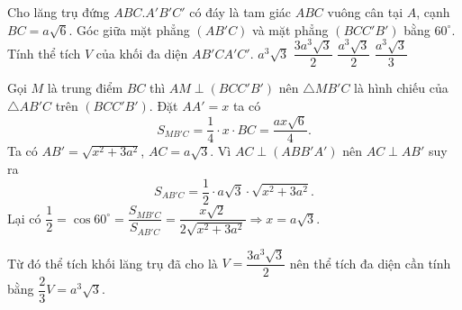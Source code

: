 \begin{ex}%
 Cho lăng trụ đứng $ABC.A'B'C'$ có đáy là tam giác $ABC$ vuông cân tại $A$, cạnh $BC=a\sqrt{6}$. Góc giữa mặt phẳng $(AB'C)$ và mặt phẳng $(BCC'B')$ bằng $60^\circ$. Tính thể tích $V$ của khối đa diện $AB'CA'C'$.
 \choice
  {\True $a^3\sqrt{3}$}
  {$\dfrac{3a^3\sqrt{3}}{2}$}
  {$\dfrac{a^3\sqrt{3}}{2}$}
  {$\dfrac{a^3\sqrt{3}}{3}$}
 \loigiai
  {
  \immini
  {
  Gọi $M$ là trung điểm $BC$ thì $AM\perp (BCC'B')$ nên $\triangle MB'C$ là hình chiếu của $\triangle AB'C$ trên $(BCC'B')$. Đặt $AA'=x$ ta có
  $$S_{MB'C}=\dfrac{1}{4}\cdot x\cdot BC=\dfrac{ax\sqrt{6}}{4}.$$
  Ta có $AB'=\sqrt{x^2+3a^2}$, $AC=a\sqrt{3}$. Vì $AC\perp (ABB'A')$ nên $AC\perp AB'$ suy ra
  $$S_{AB'C}=\dfrac{1}{2}\cdot a\sqrt{3}\cdot \sqrt{x^2+3a^2}.$$
  Lại có $\dfrac{1}{2}=\cos 60^\circ=\dfrac{S_{MB'C}}{S_{AB'C}}=\dfrac{x\sqrt{2}}{2\sqrt{x^2+3a^2}}\Rightarrow x=a\sqrt{3}$.
  }
  {
  }
  \noindent Từ đó thể tích khối lăng trụ đã cho là $V=\dfrac{3a^3\sqrt{3}}{2}$ nên thể tích đa diện cần tính bằng $\dfrac{2}{3}V=a^3\sqrt{3}$.
  }
\end{ex}


